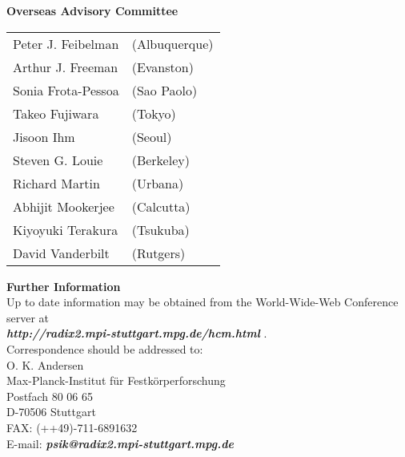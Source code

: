 {%
\noindent
{\large\bf Overseas Advisory Committee}\\[5mm]
\begin{tabular}{l l}
Peter J. Feibelman  &    (Albuquerque)\\
Arthur J. Freeman   &    (Evanston)\\
Sonia Frota-Pessoa  &    (Sao Paolo)\\
Takeo Fujiwara      &    (Tokyo)\\
Jisoon Ihm          &    (Seoul)\\
Steven G. Louie     &    (Berkeley)\\
Richard Martin      &    (Urbana)\\
Abhijit Mookerjee   &    (Calcutta)\\
Kiyoyuki Terakura   &    (Tsukuba)\\
David Vanderbilt    &    (Rutgers)\\[3mm]
\end{tabular}
\par
{\large\bf Further Information}\\[3mm]
Up to date information may be obtained from the World-Wide-Web Conference server at\\ 
{\it\bf http://radix2.mpi-stuttgart.mpg.de/hcm.html} .\\[3mm]
Correspondence should be addressed to:\\[2mm]
O. K. Andersen\\[2mm]
Max-Planck-Institut f\"ur  Festk\"orperforschung\\
Postfach 80 06 65\\
D-70506 Stuttgart\\[2mm]
FAX:    (++49)-711-6891632\\
E-mail: {\it\bf psik@radix2.mpi-stuttgart.mpg.de}



}
